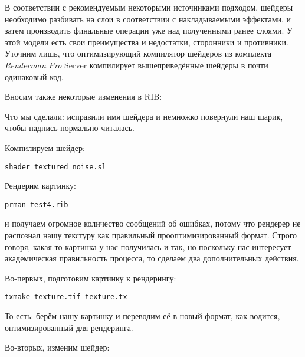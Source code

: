  В
    соответствии с рекомендуемым некоторыми источниками подходом,
    шейдеры необходимо разбивать на слои в соответствии с
    накладываемыми эффектами, и затем производить финальные операции
    уже над полученными ранее слоями. У этой модели есть свои
    преимущества и недостатки, сторонники и противники. Уточним лишь,
    что оптимизирующий компилятор шейдеров из комплекта {\it Renderman} {\it Pro} Server компилирует
    вышеприведённые шейдеры в почти одинаковый код.
  

Вносим также некоторые изменения в RIB:
  

 Что мы сделали: исправили имя шейдера и немножко
    повернули наш шарик, чтобы надпись нормально читалась.
  

 Компилируем шейдер:
  
\begin{lstlisting}[frame=single, framerule=0pt, framesep=10pt, xleftmargin=10pt, xrightmargin=10pt, basicstyle=\ttfamily \small, backgroundcolor=\color{light-gray}]
shader textured_noise.sl
\end{lstlisting}
  

 Рендерим картинку:
  
\begin{lstlisting}[frame=single, framerule=0pt, framesep=10pt, xleftmargin=10pt, xrightmargin=10pt, basicstyle=\ttfamily \small, backgroundcolor=\color{light-gray}]
prman test4.rib
\end{lstlisting}

 и получаем огромное количество сообщений об
    ошибках, потому что рендерер не распознал нашу текстуру как
    правильный прооптимизированный формат. Строго говоря, какая-то
    картинка у нас получилась и так, но поскольку нас интересует
    академическая правильность процесса, то сделаем два дополнительных
    действия.
  

 Во-первых, подготовим картинку к
    рендерингу:
  

\begin{lstlisting}[frame=single, framerule=0pt, framesep=10pt, xleftmargin=10pt, xrightmargin=10pt, basicstyle=\ttfamily \small, backgroundcolor=\color{light-gray}]
txmake texture.tif texture.tx
\end{lstlisting}  

 То есть: берём нашу картинку и переводим её в новый
    формат, как водится, оптимизированный для рендеринга.
  

 Во-вторых, изменим шейдер:
  

